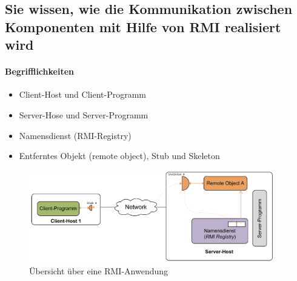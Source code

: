 \documentclass[a4paper]{article}
\begin{document}
		\subsection{Sie wissen, wie die Kommunikation zwischen Komponenten mit Hilfe von RMI realisiert wird}
		
				\paragraph{Begrifflichkeiten}
				
					\begin{itemize}
						\item Client-Host und Client-Programm
						\item Server-Hose und Server-Programm
						\item Namensdienst (RMI-Registry)
						\item Entferntes Objekt (remote object), Stub und Skeleton
					\end{itemize}

		\newpage
		
		\begin{figure}[!htb]
			\centering
			\includegraphics[keepaspectratio, height=4cm]{img/rmi/rmi.png}
			\caption{Übersicht über eine RMI-Anwendung}
			\label{fig:rmi}
		\end{figure}
	
\end{document}
